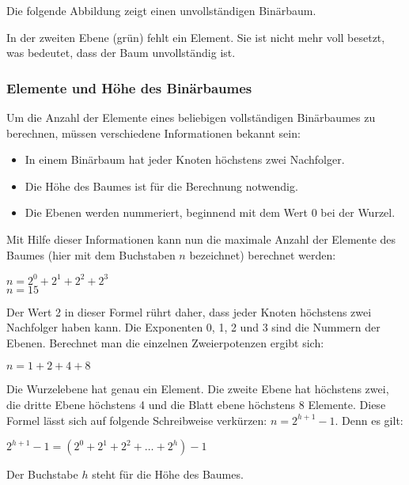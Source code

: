           Die folgende Abbildung zeigt einen unvollst\"andigen Bin\"arbaum.
          \begin{center}
          \end{center}
          In der zweiten Ebene (gr\"un) fehlt ein Element. Sie ist nicht mehr voll besetzt, was bedeutet, dass der Baum unvollst\"andig ist.
        \subsubsection{Elemente und H\"ohe des Bin\"arbaumes}
          Um die Anzahl der Elemente eines beliebigen vollst\"andigen Bin\"arbaumes zu berechnen, m\"ussen verschiedene Informationen bekannt sein:
          \begin{itemize}
            \item In einem Bin\"arbaum hat jeder Knoten h\"ochstens zwei Nachfolger.
            \item Die H\"ohe des Baumes ist f\"ur die Berechnung notwendig.
            \item Die Ebenen werden nummeriert, beginnend mit dem Wert 0 bei der Wurzel.
          \end{itemize}
          Mit Hilfe dieser Informationen kann nun die maximale Anzahl der Elemente des Baumes (hier mit dem Buchstaben $n$ bezeichnet) berechnet werden:
          \begin{center}
            $ n = 2^0 + 2^1 + 2^2 + 2^3$ \\
            $ n = 15$
          \end{center}
          Der Wert 2 in dieser Formel r\"uhrt daher, dass jeder Knoten h\"ochstens zwei Nachfolger haben kann. Die Exponenten 0, 1, 2 und 3 sind die Nummern der Ebenen. Berechnet man die einzelnen Zweierpotenzen ergibt sich:
          \begin{center}
          $ n= 1 + 2 + 4 + 8$
          \end{center}
          Die Wurzelebene hat genau ein Element. Die zweite Ebene hat h\"ochstens zwei, die dritte Ebene h\"ochstens 4 und die Blatt ebene h\"ochstens 8 Elemente. Diese Formel l\"asst sich auf folgende Schreibweise verk\"urzen: $n = 2^{h + 1} - 1$. Denn es gilt:
          \begin{center}
          $ 2^{h+1}-1 = (2^0 + 2^1 + 2^2 + \dots + 2^h) - 1$
          \end{center}
          Der Buchstabe $h$ steht f\"ur die H\"ohe des Baumes.

